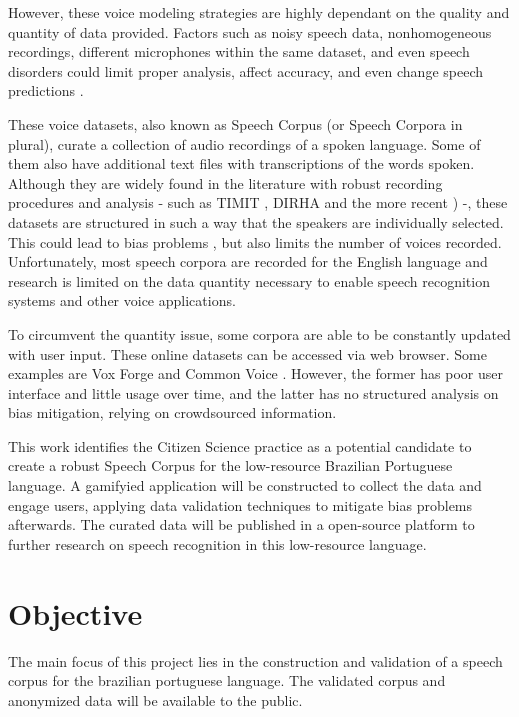 However, these voice modeling strategies are highly dependant on the quality and quantity of data provided. Factors such as noisy speech data, nonhomogeneous recordings, different microphones within the same dataset, and even speech disorders could limit proper analysis, affect accuracy, and even change speech predictions \cite{wrong}. 

These voice datasets, also known as Speech Corpus (or Speech Corpora in plural), curate a collection of audio recordings of a spoken language. Some of them also have additional text files with transcriptions of the words spoken. Although they are widely found in the literature with robust recording procedures and analysis - such as TIMIT \cite{Lamel1992timmit}, DIRHA \cite{Ravanelli2016dirha} and the more recent \cite{chanchaochai2018globaltimit}) -, these datasets are structured in such a way that the speakers are individually selected. This could lead to bias problems \cite{bender2018data}, but also limits the number of voices recorded. Unfortunately, most speech corpora are recorded for the English language \cite{LeRouxVincent2014TRdatasets} and research is limited on the data quantity necessary to enable speech recognition systems and other voice applications.

To circumvent the quantity issue, some corpora are able to be constantly updated with user input. These online datasets can be accessed via web browser. Some examples are Vox Forge and Common Voice \cite{ardila2019common}. However, the former has poor user interface and little usage over time, and the latter has no structured analysis on bias mitigation, relying on crowdsourced information.

This work identifies the Citizen Science practice as a potential candidate to create a robust Speech Corpus for the low-resource Brazilian Portuguese language. A gamifyied application will be constructed to collect the data and engage users, applying data validation techniques to mitigate bias problems afterwards. The curated data will be published in a open-source platform to further research on speech recognition in this low-resource language.

\section*{Objective}

The main focus of this project lies in the construction and validation of a speech corpus for the brazilian portuguese language. The validated corpus and anonymized data will be available to the public.

